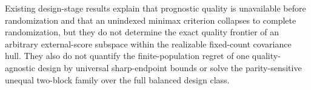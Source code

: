Existing design-stage results explain that prognostic quality is unavailable before randomization and that an unindexed minimax criterion collapses to complete randomization, but they do not determine the exact quality frontier of an arbitrary external-score subspace within the realizable fixed-count covariance hull.  They also do not quantify the finite-population regret of one quality-agnostic design by universal sharp-endpoint bounds or solve the parity-sensitive unequal two-block family over the full balanced design class.